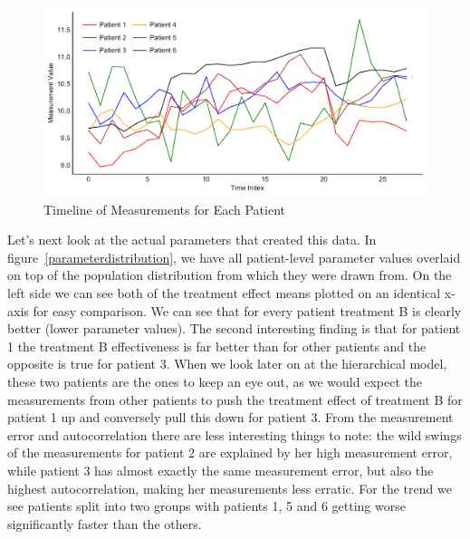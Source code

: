 \documentclass[12pt,a4paper,leqno]{report}
\theoremstyle{plain}
\theoremstyle{definition}
\theoremstyle{remark}
\begin{document}
\begin{figure}[H]
    \caption{Timeline of Measurements for Each Patient}\label{measurementtimeline}
    \bigskip
    \includegraphics[width=\textwidth,height=\textheight,keepaspectratio]{measurements_timeline.pdf}
\end{figure}

Let's next look at the actual parameters that created this data.
In figure\ \ref{parameterdistribution}, we have all patient-level parameter values
overlaid on top of the population
distribution from which they were drawn from. On the left side we can see both of the
treatment effect means plotted on an identical x-axis for easy comparison.
We can see that for every patient treatment B is clearly
better (lower parameter values). The second interesting finding is that for patient
1 the treatment B effectiveness is far better than for other patients and the opposite
is true for patient 3. When we look later on at
the hierarchical model, these two patients are the ones to keep an eye out, as we would
expect the measurements from other patients to push the treatment effect of
treatment B for patient 1 up and conversely pull this down for patient
3. From the measurement error and autocorrelation there are less interesting things to
note: the wild swings of the measurements for patient 2
are explained by her high measurement error, while patient 3 has almost exactly the same
measurement error, but also the highest autocorrelation, making her measurements less
erratic. For the trend we see patients split into two groups with patients 1, 5 and 6 getting
worse significantly faster than the others.
\end{document}
